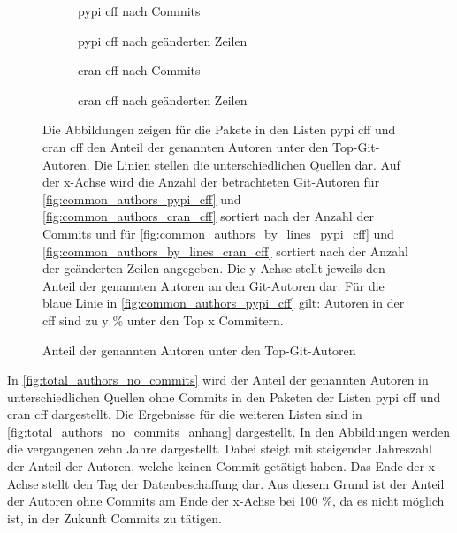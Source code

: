 \begin{figure}
    \begin{subfigure}{.5\textwidth}
        \centering
        
        \caption{\gls{pypi} \gls{cff} nach Commits}
        \label{fig:common_authors_2_pypi_cff}
    \end{subfigure}%
    \begin{subfigure}{.5\textwidth}
        \centering
        
        \caption{\gls{pypi} \gls{cff} nach geänderten Zeilen}
        \label{fig:common_authors_2_by_lines_pypi_cff}
    \end{subfigure}
    \begin{subfigure}{.5\textwidth}
        \centering
        
        \caption{\gls{cran} \gls{cff} nach Commits}
        \label{fig:common_authors_2_cran_cff}
    \end{subfigure}%
    \begin{subfigure}{.5\textwidth}
        \centering
        
        \caption{\gls{cran} \gls{cff} nach geänderten Zeilen}
        \label{fig:common_authors_2_by_lines_cran_cff}
    \end{subfigure}
    \caption{Anteil der genannten Autoren unter den Top-Git-Autoren}
    \label{fig:common_authors_2}
    \small
    Die Abbildungen zeigen für die Pakete in den Listen \gls{pypi} \gls{cff} und \gls{cran} \gls{cff} den Anteil der genannten Autoren unter den Top-Git-Autoren. Die Linien stellen die unterschiedlichen Quellen dar. Auf der x-Achse wird die Anzahl der betrachteten Git-Autoren für \autoref{fig:common_authors_pypi_cff} und \autoref{fig:common_authors_cran_cff} sortiert nach der Anzahl der Commits und für \autoref{fig:common_authors_by_lines_pypi_cff} und \autoref{fig:common_authors_by_lines_cran_cff} sortiert nach der Anzahl der geänderten Zeilen angegeben. Die y-Achse stellt jeweils den Anteil der genannten Autoren an den Git-Autoren dar. Für die blaue Linie in \autoref{fig:common_authors_pypi_cff} gilt: Autoren in der \gls{cff} sind zu y \% unter den Top x Commitern.
\end{figure}

In \autoref{fig:total_authors_no_commits} wird der Anteil der genannten Autoren in unterschiedlichen Quellen ohne Commits in den Paketen der Listen \gls{pypi} \gls{cff} und \gls{cran} \gls{cff} dargestellt.
Die Ergebnisse für die weiteren Listen sind in \autoref{fig:total_authors_no_commits_anhang} dargestellt.
In den Abbildungen werden die vergangenen zehn Jahre dargestellt.
Dabei steigt mit steigender Jahreszahl der Anteil der Autoren, welche keinen Commit getätigt haben.
Das Ende der x-Achse stellt den Tag der Datenbeschaffung dar.
Aus diesem Grund ist der Anteil der Autoren ohne Commits am Ende der x-Achse bei 100 \%, da es nicht möglich ist, in der Zukunft Commits zu tätigen.

